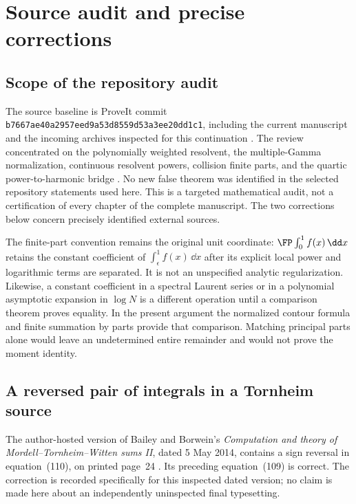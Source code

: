 \section{Source audit and precise corrections}
\label{powers:sec:audit}

\subsection{Scope of the repository audit}

The source baseline is ProveIt commit
\texttt{b7667ae40a2957eed9a53d8559d53a3ee20dd1c1}, including the
current manuscript and the incoming archives inspected for this
continuation \cite{Repo}. The review concentrated on the polynomially
weighted resolvent, the multiple-Gamma normalization, continuous
resolvent powers, collision finite parts, and the quartic
power-to-harmonic bridge \cite{Quartic,Barnes}. No new false theorem
was identified in the selected repository statements used here.
This is a targeted mathematical audit, not a certification of every
chapter of the complete manuscript. The two corrections below concern
precisely identified external sources.

The finite-part convention remains the original unit coordinate:
\(\FP\int_0^1 f(x)\,\dd x\) retains the constant coefficient of
\(\int_\epsilon^1 f(x)\,\dd x\) after its explicit local power and
logarithmic terms are separated. It is not an unspecified analytic
regularization. Likewise, a constant coefficient in a spectral Laurent
series or in a polynomial asymptotic expansion in \(\log N\) is a
different operation until a comparison theorem proves equality. In the
present argument the normalized contour formula and finite summation
by parts provide that comparison. Matching principal parts alone would
leave an undetermined entire remainder and would not prove the moment
identity.

\subsection{A reversed pair of integrals in a Tornheim source}

The author-hosted version of Bailey and Borwein's
\emph{Computation and theory of Mordell--Tornheim--Witten sums II},
dated 5 May 2014, contains a sign reversal in equation~(110), on printed
page~24 \cite{BB2014}. Its preceding equation~(109) is correct. The
correction is recorded specifically for this inspected dated version;
no claim is made here about an independently uninspected final
typesetting.

